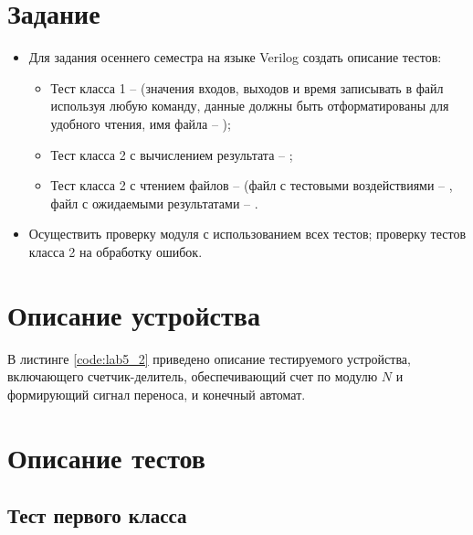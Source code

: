 





\tableofcontents
\lstlistoflistings
\listoffigures
\newpage

\section{Задание}

\begin{itemize}
	\item Для задания  осеннего семестра на языке Verilog создать описание тестов:
		\begin{itemize}
			\item Тест класса 1 --  (значения входов, выходов и время записывать в файл используя любую команду, данные должны быть отформатированы для удобного чтения, имя файла -- );
			\item Тест класса 2 с вычислением результата -- ;
			\item Тест класса 2 с чтением файлов --  (файл с тестовыми воздействиями -- , файл с ожидаемыми результатами -- .
		\end{itemize}

	\item Осуществить проверку модуля с использованием всех тестов; проверку тестов класса 2 на обработку ошибок.
\end{itemize}

\section{Описание устройства}

В листинге \ref{code:lab5_2} приведено описание тестируемого устройства, включающего счетчик-делитель, обеспечивающий счет по модулю $N$ и формирующий сигнал переноса, и конечный автомат.


\section{Описание тестов}
\label{sec:tests}

\subsection{Тест первого класса}

